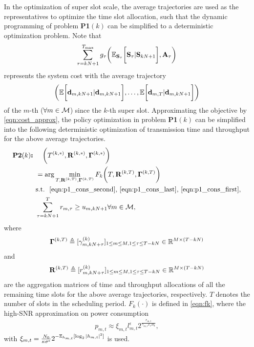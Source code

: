 In the optimization of super slot scale, the average trajectories are used as the representatives to optimize the time slot allocation, such that the dynamic programming of problem \textbf{P1$(k)$} can be simplified to a deterministic optimization problem.
Note that
\begin{align}
    \sum_{\tau=kN+1}^{{T_{\max}}} g_{\tau}\bigg(
        \mathbb{E}_{\mathbf{S}_{\tau}}\bigg[ \mathbf{S}_{\tau} | \mathbf{S}_{kN+1} \bigg], \mathbf{A}_{\tau}
    \bigg)
    \label{eqn:cost_approx}
\end{align}
represents the system cost with the average trajectory
\begin{align}
    \bigg(
        \mathbb{E}\bigg[ \mathbf{d}_{m,kN+1} | \mathbf{d}_{m,kN+1} \bigg],
        \dots,
        \mathbb{E}\bigg[ \mathbf{d}_{m,T} | \mathbf{d}_{m,kN+1} \bigg]
    \bigg)
\end{align}
of the $m$-th {\IAV} ($\forall m\in\mathcal{M}$) since the $k$-th super slot. Approximating the objective by \eqref{eqn:cost_approx}, the policy optimization in problem \textbf{P1$(k)$} can be simplified into the following deterministic optimization of transmission time and throughput for the above average trajectories.
    \begin{align}
        \textbf{P2$(k)$:~} &
        ~~~\bigg(T^{(k,*)}, \mathbf{R}^{(k,*)}, \mathbf{\Gamma}^{(k,*)} \bigg)\nonumber \\
        & = \arg\min_{ T, \mathbf{R}^{(k,T)}, \mathbf{\Gamma}^{(k,T)} } F_k\bigg( T, \mathbf{R}^{(k,T)}, \mathbf{\Gamma}^{(k,T)} \bigg)\nonumber
            \\
        &\text{s.t.~} \text{ \eqref{eqn:p1_cons_second}, \eqref{eqn:p1_cons_last}, \eqref{eqn:p1_cons_first},}
        \\
    & \sum_{ \tau=kN+1 }^{ T } r_{m,\tau} \geq {u}_{m,kN+1} \forall m\in\mathcal{M}, \label{eqn:constraint_T}
    \end{align}
where
$$
\mathbf{\Gamma}^{(k,T)} \triangleq [ \gamma^{(k)}_{m,kN+\tau} ]_{1 \leq m \leq M, 1 \leq \tau \leq T-kN} \in \mathbb{R}^{M \times (T-kN)}
$$
and
$$\mathbf{R}^{(k,T)} \triangleq [ r^{(k)}_{m,kN+\tau}]_{1 \leq m \leq M, 1 \leq \tau \leq T-kN} \in \mathbb{R}^{M \times (T-kN)}$$
are the aggregation matrices of time and throughput allocations of all the remaining time slots for the above average trajectories, respectively. $T$ denotes the number of slots in the scheduling period. $F_k(\cdot)$ is defined in \eqref{eqn:fk}, where the high-SNR approximation on power consumption
\begin{align}
    p_{m,t} \approx \xi_{m,t} l_{m,t}^{\epsilon} 2^{\frac{ r_{m,t} }{ \gamma_{m,t} T_{s} B_0 }},
\end{align}
with $\xi_{m,t} = \frac{N_0}{\kappa \sigma^\epsilon} 2^{-\mathbb{E}_{h_{m,t}}[\log_2{|h_{m,t}|^2}]}$ is used.


